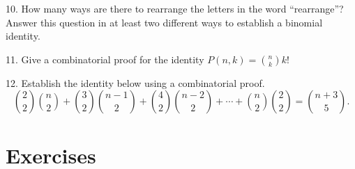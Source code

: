 \documentclass[10pt,]{book}
\theoremstyle{plain}
\theoremstyle{definition}
\numberwithin{equation}{chapter}
\begin{document}
\begin{exerciselist}
\par\smallskip
\item[10.]\hypertarget{exercise-92}{}
          How many ways are there to rearrange the letters in the word ``rearrange''? Answer this question in at least two different ways to establish a binomial identity.
\par\smallskip
\item[11.]\hypertarget{exercise-93}{}
          Give a combinatorial proof for the identity \(P(n,k) = {n \choose k}k!\)
\par\smallskip
\item[12.]\hypertarget{exercise-94}{}
          Establish the identity below using a combinatorial proof.
          \begin{equation*}
            {2 \choose 2}{n \choose 2} + {3 \choose 2}{n-1 \choose 2} + {4\choose 2}{n-2 \choose 2} + \cdots + {n\choose 2}{2\choose 2} = {n+3 \choose 5}.
          \end{equation*}
\par\smallskip
\end{exerciselist}
\typeout{************************************************}
\typeout{************************************************}
\section[Exercises]{Exercises}\label{section-9}
\typeout{************************************************}
\typeout{************************************************}
\end{document}
